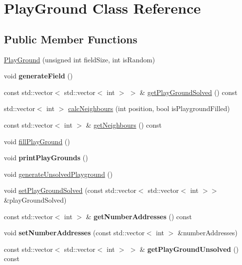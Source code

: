 \hypertarget{class_play_ground}{}\section{Play\+Ground Class Reference}
\label{class_play_ground}
\subsection*{Public Member Functions}
\begin{DoxyCompactItemize}
\item 
\mbox{\hyperlink{class_play_ground_ae6968b32015b5d0a0c60ca95f9f48271}{Play\+Ground}} (unsigned int field\+Size, int is\+Random)
\item 
\mbox{\label{class_play_ground_a087688b8e6e3eaba66689e78cce14f9c}} 
void {\bfseries generate\+Field} ()
\item 
const std\+::vector$<$ std\+::vector$<$ int $>$ $>$ \& \mbox{\hyperlink{class_play_ground_a55585e6f5f0e35ce813a8b3443c46a1d}{get\+Play\+Ground\+Solved}} () const
\item 
std\+::vector$<$ int $>$ \mbox{\hyperlink{class_play_ground_aafba04cef3f1fb053b64dba6b613ed59}{calc\+Neighbours}} (int position, bool is\+Playground\+Filled)
\item 
const std\+::vector$<$ int $>$ \& \mbox{\hyperlink{class_play_ground_a89330b39ecc7db7b8620c2c4914ff0f2}{get\+Neighbours}} () const
\item 
void \mbox{\hyperlink{class_play_ground_aea7c340233c4bf09b5fdc780090aea3e}{fill\+Play\+Ground}} ()
\item 
\mbox{\label{class_play_ground_a5b7a8d09a03943b4c6657d6f8ec04f5f}} 
void {\bfseries print\+Play\+Grounds} ()
\item 
void \mbox{\hyperlink{class_play_ground_a80ec139301e7dfcb94030b9ee518349c}{generate\+Unsolved\+Playground}} ()
\item 
void \mbox{\hyperlink{class_play_ground_a76a962fedfcfdfc5dd7764712d8bd058}{set\+Play\+Ground\+Solved}} (const std\+::vector$<$ std\+::vector$<$ int $>$$>$ \&play\+Ground\+Solved)
\item 
\mbox{\label{class_play_ground_a24340f7041408d6cfaea13e5e1b1a07b}} 
const std\+::vector$<$ int $>$ \& {\bfseries get\+Number\+Addresses} () const
\item 
\mbox{\label{class_play_ground_a0f5e54e8de3696f3ab2da2bffe9ecc10}} 
void {\bfseries set\+Number\+Addresses} (const std\+::vector$<$ int $>$ \&number\+Addresses)
\item 
\mbox{\label{class_play_ground_a5123a4f227c115ef67f04aca07ca4599}} 
const std\+::vector$<$ std\+::vector$<$ int $>$ $>$ \& {\bfseries get\+Play\+Ground\+Unsolved} () const
\end{DoxyCompactItemize}
